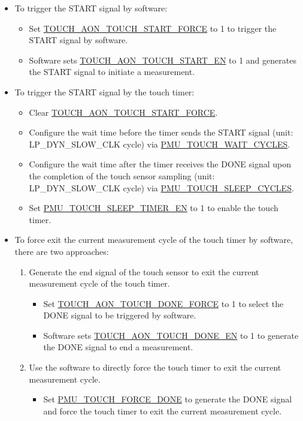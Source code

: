 \documentclass[main\_\_EN.tex]{subfiles}
\begin{document}
\begin{itemize}
    \item To trigger the START signal by software:
    \begin{itemize}
        \item Set \hyperref[fielddesc:TOUCHAONTOUCHSTARTFORCE]{TOUCH\_AON\_TOUCH\_START\_FORCE} to 1 to trigger the START signal by software.
        \item Software sets \hyperref[fielddesc:TOUCHAONTOUCHSTARTEN]{TOUCH\_AON\_TOUCH\_START\_EN} to 1 and generates the START signal to initiate a measurement.
    \end{itemize}
    \item To trigger the START signal by the touch timer:
    \begin{itemize}
        \item Clear \hyperref[fielddesc:TOUCHAONTOUCHSTARTFORCE]{TOUCH\_AON\_TOUCH\_START\_FORCE}.
        \item Configure the wait time before the timer sends the START signal (unit: LP\_DYN\_SLOW\_CLK cycle) via \hyperref[fielddesc:PMUTOUCHWAITCYCLES]{PMU\_TOUCH\_WAIT\_CYCLES}.
        \item Configure the wait time after the timer receives the DONE signal upon the completion of the touch sensor sampling (unit: LP\_DYN\_SLOW\_CLK cycle) via \hyperref[fielddesc:PMUTOUCHSLEEPCYCLES]{PMU\_TOUCH\_SLEEP\_CYCLES}.
        \item Set \hyperref[fielddesc:PMUTOUCHSLEEPTIMEREN]{PMU\_TOUCH\_SLEEP\_TIMER\_EN} to 1 to enable the touch timer.
    \end{itemize}
    \item To force exit the current measurement cycle of the touch timer by software, there are two approaches:
    \begin{enumerate}
        \item Generate the end signal of the touch sensor to exit the current measurement cycle of the touch timer.
        \begin{itemize}
            \item Set \hyperref[fielddesc:TOUCHAONTOUCHDONEFORCE]{TOUCH\_AON\_TOUCH\_DONE\_FORCE} to 1 to select the DONE signal to be triggered by software.
            \item Software sets \hyperref[fielddesc:TOUCHAONTOUCHDONEEN]{TOUCH\_AON\_TOUCH\_DONE\_EN} to 1 to generate the DONE signal to end a measurement.
        \end{itemize}
        \item Use the software to directly force the touch timer to exit the current measurement cycle.
        \begin{itemize}
            \item Set \hyperref[fielddesc:PMUTOUCHFORCEDONE]{PMU\_TOUCH\_FORCE\_DONE} to generate the DONE signal and force the touch timer to exit the current measurement cycle.
        \end{itemize}
    \end{enumerate}


\end{itemize}
\end{document}
